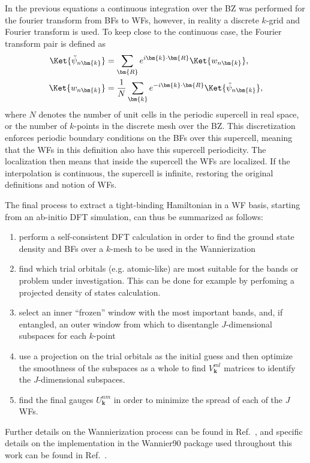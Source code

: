 In the previous equations a continuous integration over the BZ was performed for the fourier transform from BFs to WFs, however, in reality a discrete $k$-grid and Fourier transform is used.
To keep close to the continuous case, the Fourier transform pair is defined as
\begin{align}
	\Ket{\tilde{\psi}_{n\bm{k}}} &= \sum_{\bm{R}} e^{i \bm{k} \cdot \bm{R}} \Ket{w_{n\bm{k}}},\\
	\Ket{w_{n\bm{k}}} &= \frac{1}{N}\sum_{\bm{k}} e^{-i\bm{k}\cdot\bm{R}}\Ket{\tilde{\psi}_{n\bm{k}}},
\end{align}
where $N$ denotes the number of unit cells in the periodic supercell in real space, or the number of $k$-points in the discrete mesh over the BZ.
This discretization enforces periodic boundary conditions on the BFs over this supercell, meaning that the WFs in this definition also have this supercell periodicity.
The localization then means that inside the supercell the WFs are localized.
If the interpolation is continuous, the supercell is infinite, restoring the original definitions and notion of WFs.

The final process to extract a tight-binding Hamiltonian in a WF basis, starting from an ab-initio DFT simulation, can thus be summarized as follows:
\begin{enumerate}
	\item perform a self-consistent DFT calculation in order to find the ground state density and BFs over a $k$-mesh to be used in the Wannierization
	\item find which trial orbitals (e.g. atomic-like) are most suitable for the bands or problem under investigation. This can be done for example by perfoming a projected density of states calculation.
	\item select an inner ``frozen'' window with the most important bands, and, if entangled, an outer window from which to disentangle $J$-dimensional subspaces for each $k$-point
	\item use a projection on the trial orbitals as the initial guess and then optimize the smoothness of the subspaces as a whole to find $V^{ml}_{\bm{k}}$ matrices to identify the $J$-dimensional subspaces.
	\item find the final gauges $U^{nm}_{\bm{k}}$ in order to minimize the spread of each of the $J$ WFs.
\end{enumerate}

Further details on the Wannierization process can be found in Ref.~\cite{Marzari2012}, and specific details on the implementation in the Wannier90 package used throughout this work can be found in Ref.~\cite{Mostofi2014AnFunctions}.

